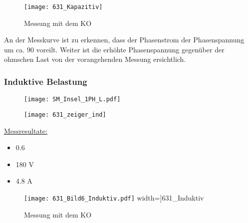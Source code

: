 \begin{flushleft}
\begin{figure}[H]
    \centering
    \texttt{[image: 631\_Kapazitiv]}
    \caption{Messung mit dem KO}
    \label{fig:abb1}
\end{figure}

An der Messkurve ist zu erkennen, dass der Phasenstrom der Phasenspannung um ca. 90 \degree voreilt. Weiter ist die erhöhte Phasenspannung gegenüber der ohmschen Last von der vorangehenden Messung ersichtlich. 









\newpage




\subsubsection{Induktive Belastung}

\begin{figure}[H]
\begin{minipage}[t]{0.52\textwidth}
\centering
\texttt{[image: SM\_Insel\_1PH\_L.pdf]}
\label{fig:abb1}
\end{minipage}
\begin{minipage}[t]{0.48\textwidth}
\centering
\texttt{[image: 631\_zeiger\_ind]}
    \label{fig:abb1}
\end{minipage}
\end{figure}


\underline{Messresultate:}\\
\vspace{0.3cm}


\begin{itemize}
\item {}     0.6\degree
\item {}            180 V
\item {}            4.8 A
\end{itemize}

\vspace{0.5cm}

\begin{figure}[H]
\centering
        \texttt{[image: 631\_Bild6\_Induktiv.pdf]}
				width=\textwidth]{631_Induktiv}
    \caption{Messung mit dem KO}
    \label{fig:abb1}
\end{figure}


\end{flushleft}
